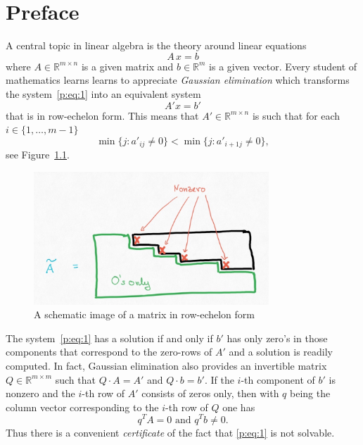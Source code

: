 
\chapter{Preface}
\label{cha:preface}

A central topic in linear algebra is the theory around  linear equations 
\begin{equation} 
\label{p:eq:1}
  A \, x = b
\end{equation}
where $A ∈ ℝ^{m×n}$ is a given matrix and $b ∈ ℝ^m$ is a given vector. Every student of mathematics learns learns to appreciate \emph{Gaussian elimination} which transforms the system~\eqref{p:eq:1}  into an equivalent system  
\begin{displaymath}
  {A}' x = {b}'
\end{displaymath}
that is in row-echelon form. This means that ${A}' ∈ ℝ^{m×n}$ is such that 
  for each $i ∈ \{ 1,\dots , m-1\}$
  \begin{displaymath}
    \min\{ j : {a}'_{ij} \neq 0\} <  \min\{ j : {a}'_{i+1j} \neq 0\},
  \end{displaymath}
see Figure~\ref{fig:8}. 


\begin{figure}
  \centering
 \includegraphics[height=5cm]{figures/RowEchelon.jpg}
  \caption{A schematic image of a matrix in row-echelon form} 
\label{fig:8}
\end{figure}


The system~\eqref{p:eq:1} has a solution if and only if ${b}'$ has only zero's in those components that correspond to the zero-rows of ${A}'$ and a solution is readily computed. In fact, Gaussian elimination also provides an invertible matrix $Q ∈ ℝ^{m ×m}$ such that $Q\cdot A = {A}'$ and $Q \cdot b = {b}'$. If the $i$-th component of ${b}'$ is nonzero and the $i$-th row of ${A}'$ consists of zeros only, then with $q$ being the column vector corresponding to the $i$-th row of $Q$ one has 
\begin{displaymath}
  q^T A = 0 \text{ and } q^Tb \neq 0. 
\end{displaymath}
Thus there is a convenient \emph{certificate} of the fact that \eqref{p:eq:1} is not solvable. 


